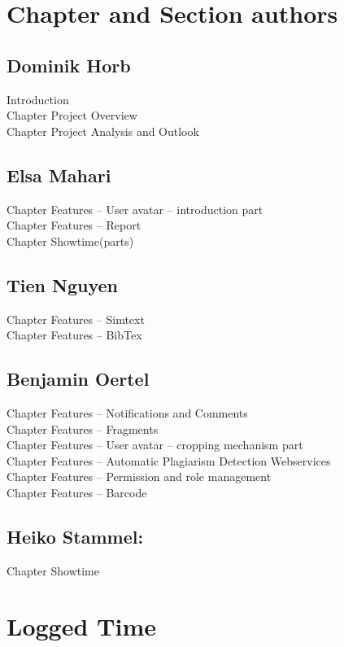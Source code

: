 \begin{appendix}

\chapter{Chapter and Section authors}

\section{Dominik Horb}
Introduction \\
Chapter Project Overview \\
Chapter Project Analysis and Outlook

\section{Elsa Mahari}
Chapter Features -- User avatar – introduction part\\
Chapter Features -- Report\\
Chapter Showtime(parts)

\section{Tien Nguyen}
Chapter Features -- Simtext\\
Chapter Features -- BibTex

\section{Benjamin Oertel}
Chapter Features -- Notifications and Comments\\
Chapter Features -- Fragments\\
Chapter Features -- User avatar – cropping mechanism part \\
Chapter Features -- Automatic Plagiarism Detection Webservices \\
Chapter Features -- Permission and role management \\
Chapter Features -- Barcode

\section{Heiko Stammel:}
Chapter Showtime \\


\chapter{Logged Time}


\end{appendix}
